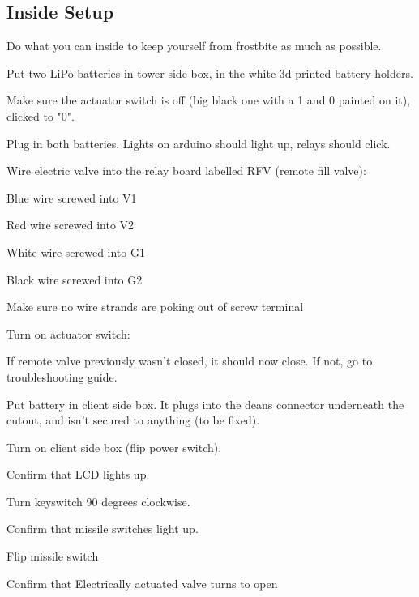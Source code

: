 \subsection{Inside Setup}
Do what you can inside to keep yourself from frostbite as much as possible.
\begin{checklist}
    \item Put two LiPo batteries in tower side box, in the white 3d printed 
battery holders.
    \item Make sure the actuator switch is off (big black one with a 1 and 0
painted on it), clicked to "0".
    \item Plug in both batteries. Lights on arduino should light up, relays
should click.
    \item Wire electric valve into the relay board labelled RFV (remote fill 
valve):
    \begin{checklist}
        \item Blue wire screwed into V1
        \item Red wire screwed into V2
        \item White wire screwed into G1
        \item Black wire screwed into G2
        \item Make sure no wire strands are poking out of screw terminal
    \end{checklist}
    \item Turn on actuator switch:
    \begin{checklist}
        \item If remote valve previously wasn't closed, it should now close. If 
not, go to troubleshooting guide.
    \end{checklist}
    \item Put battery in client side box. It plugs into the deans connector
underneath the cutout, and isn't secured to anything (to be fixed).
    \item Turn on client side box (flip power switch).
    \begin{checklist}
        \item Confirm that LCD lights up.
    \end{checklist}
    \item Turn keyswitch 90 degrees clockwise.
    \begin{checklist}
        \item Confirm that missile switches light up.
    \end{checklist}
    \item Flip \rfill{} missile switch
    \begin{checklist}
        \item Confirm that Electrically actuated valve turns to open
    \end{checklist}


\end{checklist}
